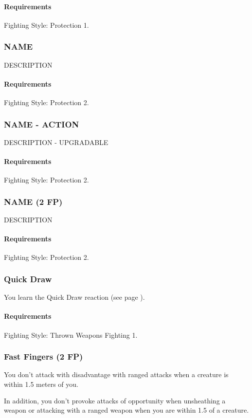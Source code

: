    \paragraph{Requirements} Fighting Style: Protection 1.
\subsubsection{NAME} \label{feat::name}
    DESCRIPTION
    \paragraph{Requirements} Fighting Style: Protection 2.
\subsubsection{NAME - ACTION} \label{feat::name}
    DESCRIPTION - UPGRADABLE
    \paragraph{Requirements} Fighting Style: Protection 2.
\subsubsection{NAME (2 FP)} \label{feat::name}
    DESCRIPTION
    \paragraph{Requirements} Fighting Style: Protection 2.
\subsubsection{Quick Draw} \label{feat::quickdraw}
    You learn the Quick Draw reaction (see page \pageref{act::quickdraw}).
    \paragraph{Requirements} Fighting Style: Thrown Weapons Fighting 1.
\subsubsection{Fast Fingers (2 FP)} \label{feat::fastfingers}
    You don't attack with disadvantage with ranged attacks when a creature is within 1.5 meters of you.

    In addition, you don't provoke attacks of opportunity when unsheathing a weapon or attacking with a ranged weapon when you are within 1.5 of a creature.
